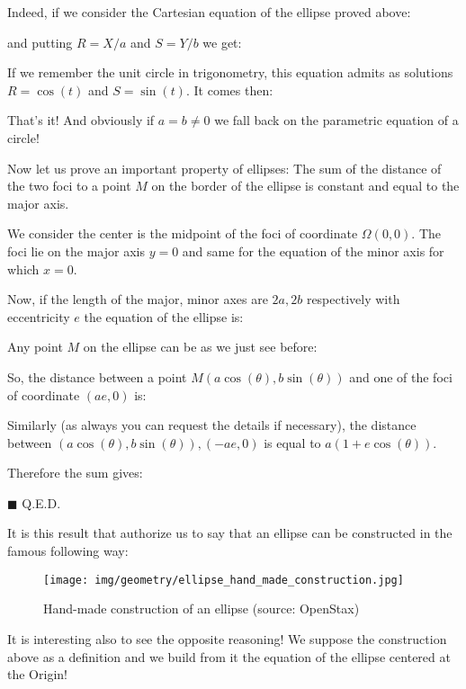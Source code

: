 \begin{enumerate}
		Indeed, if we consider the Cartesian equation of the ellipse proved above:
		
		and putting $R=X/a$ and $S=Y/b$ we get:
		
		If we remember the unit circle in trigonometry, this equation admits as solutions $R=\cos(t)$ and $S=\sin(t)$. It comes then\label{parametric equation of an ellipse}:
		
		That's it! And obviously if $a=b\neq 0$ we fall back on the parametric equation of a circle!
		
		Now let us prove an important property of ellipses: The sum of the distance of the two foci to a point $M$ on the border of the ellipse is constant and equal to the major axis.
		
		\begin{dem}
		We consider the center is the midpoint of the foci of coordinate $\Omega(0,0)$. The foci lie on the major axis $y=0$ and same for the equation of the minor axis for which $x=0$.
		
		Now, if the length of the major, minor axes are $2a,2b$ respectively with eccentricity $e$ the equation of the ellipse is:
		
		Any point $M$ on the ellipse can be as we just see before:
		
		
		So, the distance between a point $M(a\cos(\theta),b\sin(\theta))$ and one of the foci of coordinate $(ae,0)$ is:
		
		Similarly (as always you can request the details if necessary), the distance between $(a\cos(\theta),b\sin(\theta)),(-ae,0)$ is equal to $a(1+e\cos(\theta))$.
		
		Therefore the sum gives:
		
		\begin{flushright}
			$\blacksquare$  Q.E.D.
		\end{flushright}
		\end{dem}
		It is this result that authorize us to say that an ellipse can be constructed in the famous following way:
		\begin{figure}[H]
			\centering
			\texttt{[image: img/geometry/ellipse\_hand\_made\_construction.jpg]}
			\caption[Hand-made construction of an ellipse]{Hand-made construction of an ellipse (source: OpenStax)}
		\end{figure}
		It is interesting also to see the opposite reasoning! We suppose the construction above as a definition and we build from it the equation of the ellipse centered at the Origin!
		

\end{enumerate}
